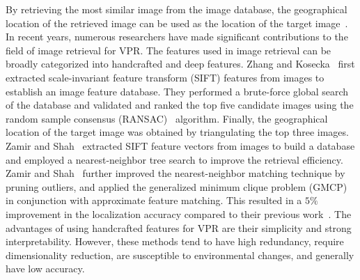 %
By retrieving the most similar image from the image database, the geographical location of the retrieved image can be used as the location of the target image~\cite{masone_survey_2021}. In recent years, numerous researchers have made significant contributions to the field of image retrieval for VPR. The features used in image retrieval can be broadly categorized into handcrafted and deep features. Zhang and Kosecka~\cite{zhang_image_2007} first extracted scale-invariant feature transform (SIFT) features from images to establish an image feature database. They performed a brute-force global search of the database and validated and ranked the top five candidate images using the random sample consensus (RANSAC)~\cite{martin_a_fischler_random_1981} algorithm. Finally, the geographical location of the target image was obtained by triangulating the top three images. Zamir and Shah~\cite{zamir_accurate_2010} extracted SIFT feature vectors from images to build a database and employed a nearest-neighbor tree search to improve the retrieval efficiency. Zamir and Shah~\cite{zamir_gps-tag_2014} further improved the nearest-neighbor matching technique by pruning outliers, and applied the generalized minimum clique problem (GMCP) in conjunction with approximate feature matching. This resulted in a $5\%$ improvement in the localization accuracy compared to their previous work~\cite{zamir_accurate_2010}. The advantages of using handcrafted features for VPR are their simplicity and strong interpretability. However, these methods tend to have high redundancy, require dimensionality reduction, are susceptible to environmental changes, and generally have low accuracy.

